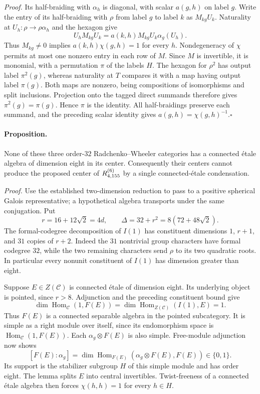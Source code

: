 \emph{Proof.}
Its half-braiding with $\alpha_h$ is diagonal, with scalar $a(g,h)$ on
label $g$. Write the entry of its half-braiding with $\rho$ from label
$g$ to label $k$ as $M_{kg}U_k$. Naturality at
$U_h:\rho\to\rho\alpha_h$ and the hexagon give
\[
 U_hM_{kg}U_k=a(k,h)M_{kg}U_k\alpha_g(U_h).
\]
Thus $M_{kg}\ne0$ implies $a(k,h)\chi(g,h)=1$ for every $h$.
Nondegeneracy of $\chi$ permits at most one nonzero entry in each row
of $M$. Since $M$ is invertible, it is monomial, with a permutation
$\pi$ of the labels $H$. The hexagon for $\rho^2$ has output label
$\pi^2(g)$, whereas naturality at $T$ compares it with a map having
output label $\pi(g)$. Both maps are nonzero, being compositions of
isomorphisms and split inclusions. Projection onto the tagged direct
summands therefore gives $\pi^2(g)=\pi(g)$. Hence $\pi$ is the identity.
All half-braidings preserve each summand, and the preceding scalar
identity gives $a(g,h)=\chi(g,h)^{-1}$.\hfill$\square$

\paragraph{Proposition.}
None of these three order-$32$ Radchenko--Wheeler categories has a
connected \'etale algebra of dimension eight in its center. Consequently
their centers cannot produce the proposed center of $R^{(6)}_{4,155}$ by a
single connected-\'etale condensation.

\emph{Proof.}
Use the established two-dimension reduction to pass to a positive
spherical Galois representative; a hypothetical algebra transports under
the same conjugation. Put
\[
 r=16+12\sqrt2=4d,\qquad
 \Delta=32+r^2=8(72+48\sqrt2).
\]
The formal-codegree decomposition of $I(1)$ has constituent dimensions
$1$, $r+1$, and $31$ copies of $r+2$. Indeed the $31$ nontrivial group
characters have formal codegree $32$, while the two remaining characters
send $\rho$ to its two quadratic roots. In particular every nonunit
constituent of $I(1)$ has dimension greater than eight.

Suppose $E\in Z(\mathcal C)$ is connected \'etale of dimension eight.
Its underlying object is pointed, since $r>8$. Adjunction and the
preceding constituent bound give
\[
 \dim\operatorname{Hom}_{\mathcal C}(1,F(E))
 =\dim\operatorname{Hom}_{Z(\mathcal C)}(I(1),E)=1.
\]
Thus $F(E)$ is a connected separable algebra in the pointed subcategory.
It is simple as a right module over itself, since its endomorphism space
is $\operatorname{Hom}_{\mathcal C}(1,F(E))$. Each $\alpha_g\otimes F(E)$
is also simple. Free-module adjunction now shows
\[
 [F(E):\alpha_g]
 =\dim\operatorname{Hom}_{F(E)}(\alpha_g\otimes F(E),F(E))\in\{0,1\}.
\]
Its support is the stabilizer subgroup $H$ of this simple module and has
order eight. The lemma splits $E$ into central invertibles. Twist-freeness
of a connected \'etale algebra then forces $\chi(h,h)=1$ for every
$h\in H$.


